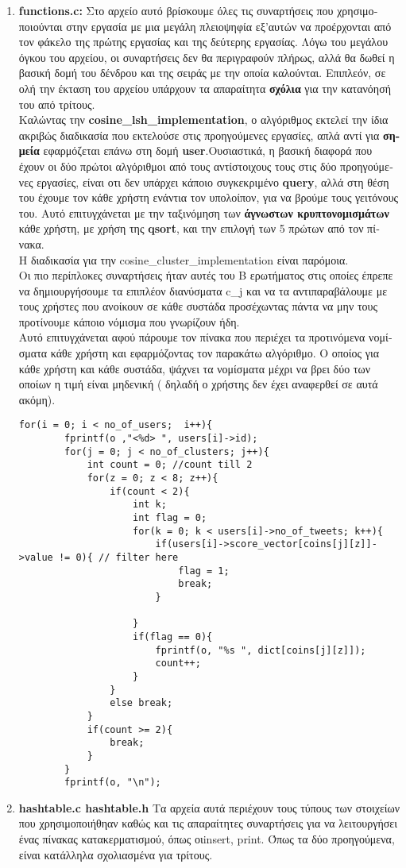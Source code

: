 \documentclass{article}
\begin{document}
\begin{enumerate}
\begin{enumerate}
\end{enumerate}

\item{ \textbf{functions.c:} \textgreek{Στο αρχείο αυτό βρίσκουμε όλες τις συναρτήσεις που χρησιμοποιούνται στην εργασία με μια μεγάλη πλειοψηφία εξ'αυτών να προέρχονται από τον φάκελο της πρώτης εργασίας και της δεύτερης εργασίας. Λόγω του μεγάλου όγκου του αρχείου, οι συναρτήσεις δεν θα περιγραφούν πλήρως, αλλά θα δωθεί η βασική δομή του δένδρου και της σειράς με την οποία καλούνται. Επιπλεόν, σε ολή την έκταση του αρχείου υπάρχουν τα απαραίτητα \textbf{σχόλια} για την κατανόησή του από τρίτους.\\ Καλώντας την} \textbf{cosine\_lsh\_implementation}, \textgreek{ο αλγόριθμος εκτελεί την ίδια ακριβώς διαδικασία που εκτελούσε στις προηγούμενες εργασίες, απλά αντί για \textbf{σημεία} εφαρμόζεται επάνω στη δομή } \textbf{user}.\textgreek{Ουσιαστικά, η βασική διαφορά που έχουν οι δύο πρώτοι αλγόριθμοι από τους αντίστοιχους τους στις δύο προηγούμενες εργασίες, είναι οτι δεν υπάρχει κάποιο συγκεκριμένο} \textbf{query}, \textgreek{αλλά στη θέση του έχουμε τον κάθε χρήστη ενάντια τον υπολοίπον, για να βρούμε τους γειτόνους του. Αυτό επιτυγχάνεται με την ταξινόμηση των \textbf{άγνωστων κρυπτονομισμάτων} κάθε χρήστη, με χρήση της } \textbf{qsort}, \textgreek{και την επιλογή των 5 πρώτων από τον πίνακα.\\ Η διαδικασία για την } cosine\_cluster\_implementation \textgreek{είναι παρόμοια.\\ Οι πιο περίπλοκες συναρτήσεις ήταν αυτές του Β ερωτήματος στις οποίες έπρεπε να δημιουργήσουμε τα επιπλέον διανύσματα } c\_{j} \textgreek{και να τα αντιπαραβάλουμε με τους χρήστες που ανοίκουν σε κάθε συστάδα προσέχωντας πάντα να μην τους προτίνουμε κάποιο νόμισμα που γνωρίζουν ήδη.\\ Αυτό επιτυγχάνεται αφού πάρουμε τον πίνακα που περιέχει τα προτινόμενα νομίσματα κάθε χρήστη και εφαρμόζοντας τον παρακάτω αλγόριθμο. Ο οποίος για κάθε χρήστη και κάθε συστάδα, ψάχνει τα νομίσματα μέχρι να βρει δύο των οποίων η τιμή είναι μηδενική ( δηλαδή ο χρήστης δεν έχει αναφερθεί σε αυτά ακόμη).}
\begin{verbatim}
for(i = 0; i < no_of_users;  i++){
		fprintf(o ,"<%d> ", users[i]->id);
		for(j = 0; j < no_of_clusters; j++){
			int count = 0; //count till 2
			for(z = 0; z < 8; z++){
				if(count < 2){
					int k;
					int flag = 0;
					for(k = 0; k < users[i]->no_of_tweets; k++){
						if(users[i]->score_vector[coins[j][z]]->value != 0){ // filter here
							flag = 1;
							break;
						}

					}
					if(flag == 0){
						fprintf(o, "%s ", dict[coins[j][z]]);
						count++;
					}
				}
				else break;
			}
			if(count >= 2){
				break;
			}
		}
		fprintf(o, "\n");
\end{verbatim}
}
\item{\textbf{hashtable.c hashtable.h}} \textgreek{Τα αρχεία αυτά περιέχουν τους τύπους των στοιχείων που χρησιμοποιήθηαν καθώς και τις απαραίτητες συναρτήσεις για να λειτουργήσει ένας πίνακας κατακερματισμού, όπως οι}insert, print. \textgreek{Όπως τα δύο προηγούμενα, είναι κατάλληλα σχολιασμένα για τρίτους.}
\end{enumerate}
\end{document}
